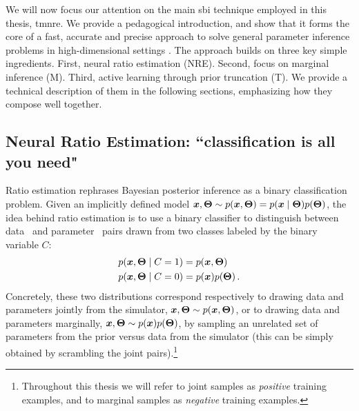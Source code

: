 We will now focus our attention on the main \gls*{sbi} technique employed in this thesis, \gls*{tmnre}. We provide a pedagogical introduction, and show that it forms the core of a fast, accurate and precise approach to solve general parameter inference problems in high-dimensional settings \cite{Miller:2020hua, Miller:2021aa, Miller:2022shs}. The approach builds on three key simple ingredients. First, neural ratio estimation (NRE). Second, focus on marginal inference (M).  Third, active learning through prior truncation (T).  We provide a technical description of them in the following sections, emphasizing how they compose well together.

\subsection{Neural Ratio Estimation: ``classification is all you need"} \label{subsec:tmnre-nre}

Ratio estimation rephrases Bayesian posterior inference as a binary classification problem.
Given an implicitly defined model $\bm{x}, \bm{\Theta} \sim p(\bm{x}, \bm{\Theta}) = p(\bm{x}\mid\bm{\Theta})p(\bm{\Theta})$, the idea behind ratio estimation is to use a binary classifier to distinguish between data \data\ and parameter \param\ pairs  drawn from two classes labeled by the binary variable $C$:
\begin{align}
    p(\bm{x}, \bm{\Theta}  \mid C = 1) &= p(\bm{x}, \bm{\Theta} ) \\
    p(\bm{x}, \bm{\Theta}  \mid C = 0) &= p(\bm{x}) p(\bm{\Theta} ) \, .
\end{align}
Concretely, these two distributions correspond respectively to drawing data and parameters jointly from the simulator, $\bm{x}, \bm{\Theta} \sim p(\bm{x}, \bm{\Theta})$, or to drawing data and parameters marginally, $\bm{x}, \bm{\Theta} \sim p(\bm{x}) p(\bm{\Theta})$, by sampling an unrelated set of parameters from the prior versus data from the simulator (this can be simply obtained by scrambling the joint pairs).\footnote{Throughout this thesis we will refer to joint samples as \emph{positive} training examples, and to marginal samples as \emph{negative} training examples.} 

